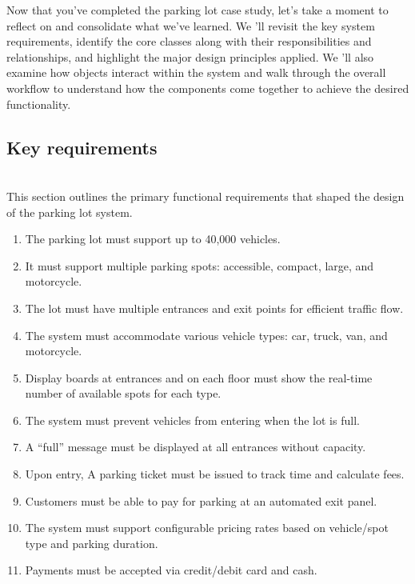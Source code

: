 

Now that you've completed the parking lot case study, let's take a moment to reflect on and consolidate what we've learned. We 'll revisit the key system requirements, identify the core classes along with their responsibilities and relationships, and highlight the major design principles applied. We
'll also examine how objects interact within the system and walk through the overall workflow to understand how the components come together to achieve the desired functionality.

\subsection{Key requirements}\label{eYcVBG4NYl_iHMHYdKGdq}
\\
This section outlines the primary functional requirements that shaped the design of the parking lot system.

\begin{enumerate}
\item
\protect{}\label{EM-QNtd_zH5TeM8RE0CSM}
The parking lot must support up to 40,000 vehicles.
\item
It must support multiple parking spots: accessible, compact, large, and motorcycle.
\item
The lot must have multiple entrances and exit points for efficient traffic flow.
\item
\protect{}\label{NocK7Mm31cIYjcF4OYt9r}
The system must accommodate various vehicle types: car, truck, van, and motorcycle.
\item
\protect{}\label{ToL-xomzfPBz_JkT_U0t1}
Display boards at entrances and on each floor must show the real-time number of available spots for each type.
\item
\protect{}\label{091te_LaRkDxZBY7gOxA7}
The system must prevent vehicles from entering when the lot is full.
\item
\protect{}\label{zqFKTGwa3nnc9YUfpMn2a}
A ``full'' message must be displayed at all entrances without capacity.
\item
\protect{}\label{Sd6pH5Kl27bLXTcH6Wiri}
Upon entry, A parking ticket must be issued to track time and calculate fees.
\item
\protect{}\label{SKsJuoNWRwg5ag34K2RQR}
Customers must be able to pay for parking at an automated exit panel.
\item
\protect{}\label{kuQbvMdL6FeSaxvFHA1Kd}
The system must support configurable pricing rates based on vehicle/spot type and parking duration.
\item
\protect{}\label{5RzublxLfh4zqVGKZzM2w}
Payments must be accepted via credit/debit card and cash.
\end{enumerate}

